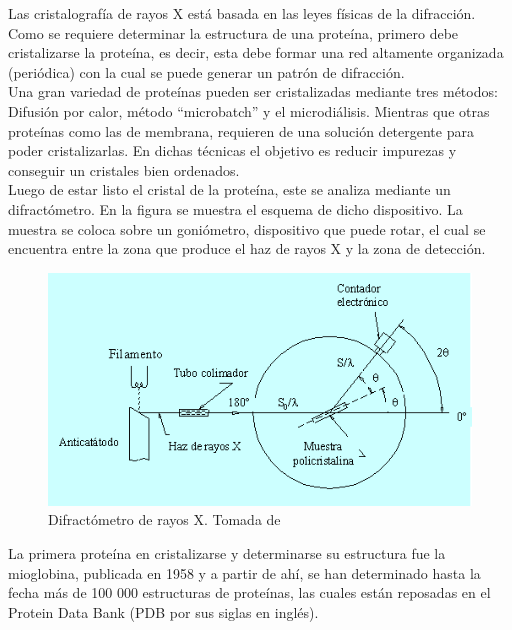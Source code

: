 Las cristalograf\'{i}a de rayos X est\'{a} basada en las leyes f\'{i}sicas de la difracci\'{o}n. Como se requiere determinar la estructura de una prote\'{i}na, primero debe cristalizarse la prote\'{i}na, es decir, esta debe formar una red altamente organizada (peri\'{o}dica) con la cual se puede generar un patr\'{o}n de difracci\'{o}n.\\

Una gran variedad de prote\'{i}nas pueden ser cristalizadas mediante tres m\'{e}todos: Difusi\'{o}n por calor, m\'{e}todo ``microbatch'' y el microdi\'{a}lisis. Mientras que otras prote\'{i}nas como las de membrana, requieren de una soluci\'{o}n detergente para poder cristalizarlas. En dichas t\'{e}cnicas el objetivo es reducir impurezas y conseguir un cristales bien ordenados.\\

Luego de estar listo el cristal de la prote\'{i}na, este se analiza mediante un difract\'{o}metro. En la figura se muestra el esquema de dicho dispositivo. La muestra se coloca sobre un goni\'{o}metro, dispositivo que puede rotar, el cual se encuentra entre la zona que produce el haz de rayos X y la zona de detecci\'{o}n.\\
\begin{figure}[h]
 \centering
 \includegraphics[scale=0.5]{Kap3/diffractometer.png}
 \caption{Difract\'{o}metro de rayos X. Tomada de \cite{UniversidadPolitecnicadeValenciaMetodoX}}
 \label{fig:dif}
\end{figure}


La primera prote\'{i}na en cristalizarse y determinarse su estructura fue la mioglobina, publicada en 1958 \cite{Nelson2011} y a partir de ah\'{i}, se han determinado hasta la fecha m\'{a}s de 100 000 estructuras de prote\'{i}nas, las cuales est\'{a}n reposadas en el Protein Data Bank (PDB por sus siglas en ingl\'{e}s).\\

